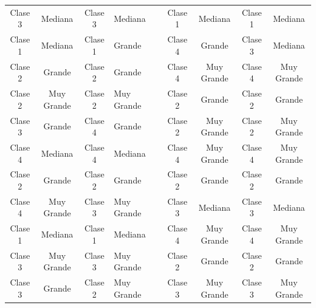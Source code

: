 \begin{table}[ht]
{\begin{tabular}{|cc|cl|l|cc|cc|}
		\multicolumn{1}{|c|}{Clase 3} & Mediana    & \multicolumn{1}{c|}{Clase 3} & Mediana    &  & \multicolumn{1}{c|}{Clase 1} & Mediana    & \multicolumn{1}{c|}{Clase 1} & Mediana    \\ \cline{1-4} \cline{6-9} 
		\multicolumn{1}{|c|}{Clase 1} & Mediana    & \multicolumn{1}{c|}{Clase 1} & Grande     &  & \multicolumn{1}{c|}{Clase 4} & Grande     & \multicolumn{1}{c|}{Clase 3} & Mediana    \\ \cline{1-4} \cline{6-9} 
		\multicolumn{1}{|c|}{Clase 2} & Grande     & \multicolumn{1}{c|}{Clase 2} & Grande     &  & \multicolumn{1}{c|}{Clase 4} & Muy Grande & \multicolumn{1}{c|}{Clase 4} & Muy Grande \\ \cline{1-4} \cline{6-9} 
		\multicolumn{1}{|c|}{Clase 2} & Muy Grande & \multicolumn{1}{c|}{Clase 2} & Muy Grande &  & \multicolumn{1}{c|}{Clase 2} & Grande     & \multicolumn{1}{c|}{Clase 2} & Grande     \\ \cline{1-4} \cline{6-9} 
		\multicolumn{1}{|c|}{Clase 3} & Grande     & \multicolumn{1}{c|}{Clase 4} & Grande     &  & \multicolumn{1}{c|}{Clase 2} & Muy Grande & \multicolumn{1}{c|}{Clase 2} & Muy Grande \\ \cline{1-4} \cline{6-9} 
		\multicolumn{1}{|c|}{Clase 4} & Mediana    & \multicolumn{1}{c|}{Clase 4} & Mediana    &  & \multicolumn{1}{c|}{Clase 4} & Muy Grande & \multicolumn{1}{c|}{Clase 4} & Muy Grande \\ \cline{1-4} \cline{6-9} 
		\multicolumn{1}{|c|}{Clase 2} & Grande     & \multicolumn{1}{c|}{Clase 2} & Grande     &  & \multicolumn{1}{c|}{Clase 2} & Grande     & \multicolumn{1}{c|}{Clase 2} & Grande     \\ \cline{1-4} \cline{6-9} 
		\multicolumn{1}{|c|}{Clase 4} & Muy Grande & \multicolumn{1}{c|}{Clase 3} & Muy Grande &  & \multicolumn{1}{c|}{Clase 3} & Mediana    & \multicolumn{1}{c|}{Clase 3} & Mediana    \\ \cline{1-4} \cline{6-9} 
		\multicolumn{1}{|c|}{Clase 1} & Mediana    & \multicolumn{1}{c|}{Clase 1} & Mediana    &  & \multicolumn{1}{c|}{Clase 4} & Muy Grande & \multicolumn{1}{c|}{Clase 4} & Muy Grande \\ \cline{1-4} \cline{6-9} 
		\multicolumn{1}{|c|}{Clase 3} & Muy Grande & \multicolumn{1}{c|}{Clase 3} & Muy Grande &  & \multicolumn{1}{c|}{Clase 2} & Grande     & \multicolumn{1}{c|}{Clase 2} & Grande     \\ \cline{1-4} \cline{6-9} 
		\multicolumn{1}{|c|}{Clase 3} & Grande     & \multicolumn{1}{c|}{Clase 2} & Muy Grande &  & \multicolumn{1}{c|}{Clase 3} & Muy Grande & \multicolumn{1}{c|}{Clase 3} & Muy Grande \\ \cline{1-4} \cline{6-9} 

\end{tabular}}
\end{table}
